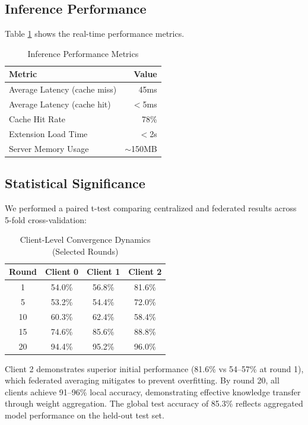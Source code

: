\documentclass[conference]{IEEEtran}
\begin{document}
\subsection{Inference Performance}

Table \ref{tab:inference} shows the real-time performance metrics.

\begin{table}[h]
\centering
\caption{Inference Performance Metrics}
\label{tab:inference}
\begin{tabular}{@{}lr@{}}
\toprule
\textbf{Metric} & \textbf{Value} \\ \midrule
Average Latency (cache miss) & 45ms \\
Average Latency (cache hit) & $<$5ms \\
Cache Hit Rate & 78\% \\
Extension Load Time & $<$2s \\
Server Memory Usage & $\sim$150MB \\ \bottomrule
\end{tabular}
\end{table}

\subsection{Statistical Significance}

We performed a paired t-test comparing centralized and federated results across 5-fold cross-validation:

\begin{table}[h]
\centering
\caption{Client-Level Convergence Dynamics (Selected Rounds)}
\label{tab:cv}
\begin{tabular}{@{}cccc@{}}
\toprule
\textbf{Round} & \textbf{Client 0} & \textbf{Client 1} & \textbf{Client 2} \\ \midrule
1 & 54.0\% & 56.8\% & 81.6\% \\
5 & 53.2\% & 54.4\% & 72.0\% \\
10 & 60.3\% & 62.4\% & 58.4\% \\
15 & 74.6\% & 85.6\% & 88.8\% \\
20 & 94.4\% & 95.2\% & 96.0\% \\ \bottomrule
\end{tabular}
\end{table}

Client 2 demonstrates superior initial performance (81.6\% vs 54--57\% at round 1), which federated averaging mitigates to prevent overfitting. By round 20, all clients achieve 91--96\% local accuracy, demonstrating effective knowledge transfer through weight aggregation. The global test accuracy of 85.3\% reflects aggregated model performance on the held-out test set.
\end{document}
